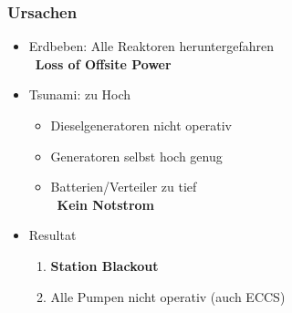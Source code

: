 \documentclass[12pt]{article}
\begin{document}
\subsubsection{Ursachen}
\begin{itemize}
  \item Erdbeben: Alle Reaktoren heruntergefahren\\
  \textrightarrow\ \textbf{Loss of Offsite Power}
  \item Tsunami: zu Hoch
  \begin{itemize}
    \item Dieselgeneratoren nicht operativ
    \item Generatoren selbst hoch genug
    \item Batterien/Verteiler zu tief\\
    \textrightarrow\ \textbf{Kein Notstrom}
  \end{itemize}
  \item Resultat
  \begin{enumerate}[label = \textrightarrow]
  \item \textbf{Station Blackout}
  \item Alle Pumpen nicht operativ (auch ECCS)
  \end{enumerate}
\end{itemize}
\end{document}
